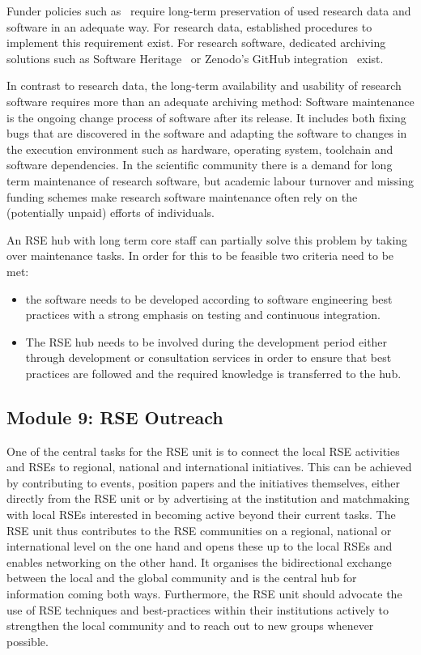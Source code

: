 \documentclass[a4paper]{article}
\begin{document}
Funder policies such as~\autocite{dfg_gsp} require long-term preservation of used research data and software in an adequate way.
For research data, established procedures to implement this requirement exist.
For research software, dedicated archiving solutions such as Software Heritage~\autocite{DiCosmo2020,DiCosmo2023} or Zenodo's GitHub integration~\autocite{GitHubZenodo} exist.

In contrast to research data, the long-term availability and usability of research software requires more than an adequate archiving method:
Software maintenance is the ongoing change process of software after its release.
It includes  both fixing  bugs that are discovered in the software and adapting the software to changes in the execution environment such as hardware, operating system, toolchain and software dependencies.
In the scientific community there is a demand for long term maintenance of research software,
but academic labour turnover and missing funding schemes make research software maintenance often rely on the (potentially unpaid) efforts of individuals.

An RSE hub with long term core staff can partially solve this problem by taking over maintenance tasks.
In order for this to be feasible two criteria need to be met:
\begin{itemize}
\item the software needs to be developed according to software engineering best practices with a strong emphasis on testing and continuous integration.
\item The RSE hub needs to be involved during the development period either through development or consultation services in order to ensure that best practices are followed and the required knowledge is transferred to the hub.
\end{itemize}

\subsection{Module 9: RSE Outreach}%
\label{sec:outreach}

One of the central tasks for the RSE unit is to connect the local RSE activities and RSEs to regional, national and international initiatives.
This can be achieved by contributing to events, position papers and the initiatives themselves,
either directly from the RSE unit or by advertising at the institution and matchmaking with local RSEs interested in becoming active beyond their current tasks.
The RSE unit thus contributes to the RSE communities on a regional, national or international level on the one hand and opens these up to the local RSEs and enables networking on the other hand.
It organises the bidirectional exchange between the local and the global community and is the central hub for information coming both ways.
Furthermore, the RSE unit should advocate the use of RSE techniques and best-practices within their institutions actively to strengthen the local community and to reach out to new groups whenever possible.
\end{document}
